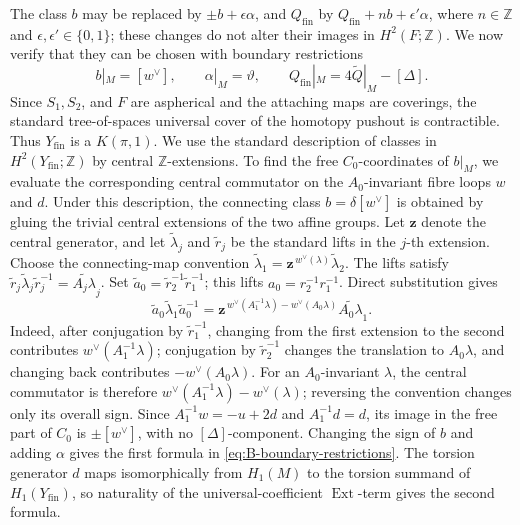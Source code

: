 \documentclass[11pt]{article}
\theoremstyle{definition}
\theoremstyle{remark}
\numberwithin{equation}{section}
\begin{document}
The class $b$ may be replaced by $\pm b+\epsilon\alpha$, and
$Q_{\mathrm{fin}}$ by $Q_{\mathrm{fin}}+n b+\epsilon'\alpha$, where
$n\in\mathbb Z$ and $\epsilon,\epsilon'\in\{0,1\}$; these changes do not
alter their images in $H^2(F;\mathbb Z)$.  We now verify that they can be
chosen with boundary restrictions
\begin{equation}\label{eq:B-boundary-restrictions}
 b|_M=[w^\vee],\qquad
 \alpha|_M=\vartheta,\qquad
 Q_{\mathrm{fin}}|_M=4\widetilde Q|_M-[\Delta].
\end{equation}
Since $S_1,S_2$, and $F$ are aspherical and the attaching maps are
coverings, the standard tree-of-spaces universal cover of the homotopy
pushout is contractible.  Thus $Y_{\mathrm{fin}}$ is a $K(\pi,1)$.  We
use the standard description of classes in
$H^2(Y_{\mathrm{fin}};\mathbb Z)$ by central $\mathbb Z$-extensions.  To
find the free $C_0$-coordinates of $b|_M$,
we evaluate the corresponding central commutator on the $A_0$-invariant
fibre loops $w$ and $d$.  Under this description, the connecting class
$b=\delta[w^\vee]$ is obtained by gluing the trivial central extensions of
the two affine groups.  Let $\mathbf z$
denote the central generator, and let $\widetilde\lambda_j$ and
$\widetilde r_j$ be the standard lifts in the $j$-th extension.  Choose
the connecting-map convention
$\widetilde\lambda_1
=\mathbf z^{\,w^\vee(\lambda)}\widetilde\lambda_2$.
The lifts satisfy
$\widetilde r_j\widetilde\lambda_j\widetilde r_j^{-1}
=\widetilde{A_j\lambda}_j$.  Set
$\widetilde a_0=\widetilde r_2^{-1}\widetilde r_1^{-1}$; this lifts
$a_0=r_2^{-1}r_1^{-1}$.  Direct substitution gives
\[
 \widetilde a_0\widetilde\lambda_1\widetilde a_0^{-1}
 =\mathbf z^{\,w^\vee(A_1^{-1}\lambda)-w^\vee(A_0\lambda)}
   \widetilde{A_0\lambda}_1.
\]
Indeed, after conjugation by $\widetilde r_1^{-1}$, changing from the first
extension to the second contributes $w^\vee(A_1^{-1}\lambda)$;
conjugation by $\widetilde r_2^{-1}$ changes the translation to
$A_0\lambda$, and changing back contributes
$-w^\vee(A_0\lambda)$.  For an $A_0$-invariant $\lambda$, the central
commutator is therefore
$w^\vee(A_1^{-1}\lambda)-w^\vee(\lambda)$; reversing the convention changes
only its overall sign.  Since $A_1^{-1}w=-u+2d$ and $A_1^{-1}d=d$, its
image in the free part of $C_0$ is $\pm[w^\vee]$, with no
$[\Delta]$-component.  Changing the sign of $b$ and adding $\alpha$
gives the first formula in \eqref{eq:B-boundary-restrictions}.  The torsion
generator $d$ maps
isomorphically from $H_1(M)$ to the torsion summand of
$H_1(Y_{\mathrm{fin}})$, so
naturality of the universal-coefficient $\operatorname{Ext}$-term gives
the second formula.
\end{document}
